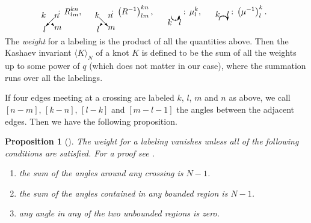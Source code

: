 \documentclass[a4paper]{amsart}
\theoremstyle{plain}
\newtheorem{prop}[thm]{Proposition}
\theoremstyle{definition}
\theoremstyle{remark}
\numberwithin{equation}{section}
\numberwithin{figure}{section}
\begin{document}
\begin{equation*}
\raisebox{-5mm}{\begin{picture}(10,10)
  \put(10,10){\vector(-1,-1){10}}
  \put( 6, 4){\vector( 1,-1){ 4}}
  \put( 4, 6){\line(-1, 1){ 4}}
  \put( 0,10){\makebox(0,0)[br]{$k$}}\put(10,10){\makebox(0,0)[bl]{$n$}}
  \put( 0, 0){\makebox(0,0)[tr]{$l$}}\put(10, 0){\makebox(0,0)[tl]{$m$}}
\end{picture}}
\, :\,R_{lm}^{kn},\qquad
\raisebox{-5mm}{\begin{picture}(10,10)
  \put( 0,10){\vector( 1,-1){10}}
  \put(10,10){\line(-1,-1){ 4}}
  \put( 4, 4){\vector(-1,-1){ 4}}
  \put( 0,10){\makebox(0,0)[br]{$k$}}\put(10,10){\makebox(0,0)[bl]{$n$}}
  \put( 0, 0){\makebox(0,0)[tr]{$l$}}\put(10, 0){\makebox(0,0)[tl]{$m$}}
\end{picture}}
\, :\,\left(R^{-1}\right)_{lm}^{kn},\qquad
\raisebox{-2.5mm}{\begin{picture}(10,5)
  \qbezier(0,5)(0,0)(5,0)
  \qbezier(5,0)(10,0)(10,5)
  \put(5,-1){\line(0,1){2}}
  \put(9,5.5){\vector(0,1){0}}
  \put(1,1){\makebox(0,0)[tr]{$k$}}
  \put(9,1){\makebox(0,0)[tl]{$l$}}
\end{picture}}
\, :\,\mu_{l}^{k},\qquad
\raisebox{-2.5mm}{\begin{picture}(10,5)
  \qbezier(0,0)(0,5)(5,5)
  \qbezier(5,5)(10,5)(10,0)
  \put(5,4){\line(0,1){2}}
  \put(10.1,-0.5){\vector(0,-1){0}}
  \put(1,4){\makebox(0,0)[br]{$k$}}
  \put(9,4){\makebox(0,0)[bl]{$l$}}
\end{picture}}
\,:\,\left(\mu^{-1}\right)_{l}^{k}.
\end{equation*}
\smallskip
\par
The {\em weight} for a labeling is the product of all the
quantities above.
Then the Kashaev invariant $\langle{K}\rangle_N$ of a knot $K$ is defined
to be the sum of all the weights up to some power of $q$ (which does not matter
in our case), where the summation runs over all the labelings.
\par
If four edges meeting at a crossing are labeled $k$, $l$, $m$ and $n$ as above,
we call $[n-m]$, $[k-n]$, $[l-k]$ and $[m-l-1]$ the angles between the adjacent
edges.
Then we have the following proposition.
\begin{prop}[{\cite[Proposition 2]{Yokota:volume}}]\label{prop:angle}
The weight for a labeling vanishes unless all of the following conditions
are satisfied.
For a proof see \cite{Yokota:volume}.
\par
  \begin{enumerate}
  \item the sum of the angles around any crossing is $N-1$.
  \item the sum of the angles contained in any bounded region is $N-1$.
  \item any angle in any of the two unbounded regions is zero.
  \end{enumerate}
\end{prop}
\end{document}
